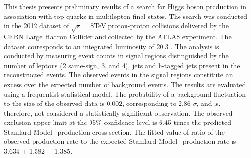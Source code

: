 

This thesis presents preliminary results of a search for Higgs boson production
in association with top quarks in multilepton final states. The search
was conducted in the 2012 dataset of $\sqrt{s}=8$TeV proton-proton
collisions delivered by the CERN Large Hadron Collider and collected by
the ATLAS experiment. The dataset corresponds to an integrated luminosity of
20.3 \ifb. The analysis is conducted by measuring event counts in
signal regions distinguished by the number of leptons (2 same-sign, 
3, and 4), jets and b-tagged jets present in the reconstructed events. The observed
events in the signal regions constitute an excess over
the expected number of background events. The results
are evaluated using a frequentist statistical model. The
probability of a background fluctuation to the
size of the observed data is 0.002, corresponding to 2.86 $\sigma$,
and is, therefore, not considered a statistically significant observation. 
The observed exclusion upper limit at the 95\% confidence
level is 6.45 times the predicted
Standard Model \tth\ production cross section. The fitted value of
ratio of the observed production rate to the expected Standard Model
\tth\ production rate is 3.634 $+$ 1.582 $-$ 1.385. 

